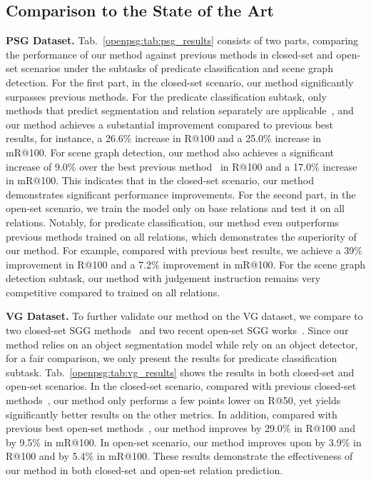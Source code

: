 \subsection{Comparison to the State of the Art}

\noindent \textbf{PSG Dataset.}
Tab.~\ref{openpsg:tab:psg_results} consists of two parts, comparing the performance of our method against previous methods in closed-set and open-set scenarios under the subtasks of predicate classification and scene graph detection.
For the first part, in the closed-set scenario, our method significantly surpasses previous methods.
For the predicate classification subtask, only methods that predict segmentation and relation separately are applicable~\citep{yang2022panoptic}, and our method achieves a substantial improvement compared to previous best results, for instance, a 26.6\% increase in R@100 and a 25.0\% increase in mR@100.
For scene graph detection, our method also achieves a significant increase of 9.0\% over the best previous method~\citep{zhou2023hilo} in R@100 and a 17.0\% increase in mR@100.
This indicates that in the closed-set scenario, our method demonstrates significant performance improvements.
For the second part, in the open-set scenario, we train the model only on base relations and test it on all relations.
Notably, for predicate classification, our method even outperforms previous methods trained on all relations, which demonstrates the superiority of our method.
For example, compared with previous best results, we achieve a 39\% improvement in R@100 and a 7.2\% improvement in mR@100.
For the scene graph detection subtask, our method with judgement instruction remains very competitive compared to \citep{yang2022panoptic} trained on all relations.

\noindent \textbf{VG Dataset.}
To further validate our method on the VG dataset, we compare to two closed-set SGG methods~\citep{zellers2018neural, tang2019learning} and two recent open-set SGG works~\citep{yu2023visually, chen2023expanding}.
Since our method relies on an object segmentation model while \citep{zellers2018neural, tang2019learning, yu2023visually, chen2023expanding} rely on an object detector, for a fair comparison, we only present the results for predicate classification subtask.
Tab.~\ref{openpsg:tab:vg_results} shows the results in both closed-set and open-set scenarios.
In the closed-set scenario, compared with previous closed-set methods~\citep{zellers2018neural, tang2019learning}, our method only performs a few points lower on R@50, yet yields significantly better results on the other metrics.
In addition, compared with previous best open-set methods~\citep{yu2023visually, chen2023expanding}, our method improves by 29.0\% in R@100 and by 9.5\% in mR@100.
In open-set scenario, our method improves upon\citep{yu2023visually, chen2023expanding} by 3.9\% in R@100 and by 5.4\% in mR@100.
These results demonstrate the effectiveness of our method in both closed-set and open-set relation prediction.

